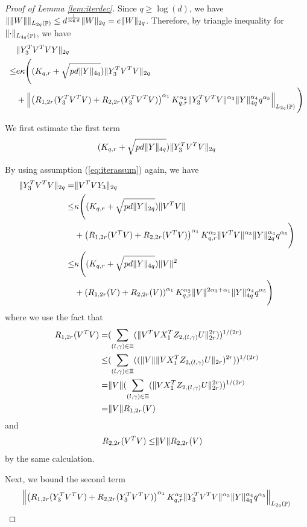 \documentclass[10pt,a4paper]{amsart}
\DeclareMathOperator{\Pb}{\mathbb{P}}
\DeclarePairedDelimiter{\norm}{\lVert}{\rVert}
\newcommand{\norml}[1]{\left\lVert#1\right\rVert}
\begin{document}
\begin{proof}[Proof of Lemma \ref{lem:iterdec}]
Since $q \ge \log(d)$, we have $\norm{\norm{W}}_{L_{2q}(\Pb)}  \le d^{\frac{1}{\log d}} \norm{W}_{2q}= e \norm{W}_{2q}$. Therefore, by triangle inequality for $\norm{\cdot}_{L_{4q}(\Pb)}$, we have
    \begin{align*}
    &\norm{Y_3^TV^TVY}_{2q} \\\le& e\kappa \Bigg((K_{q,r}+\sqrt{pd\norm{Y}_{4q}})\norm{Y_3^TV^TV}_{2q} \\&+ \norml{\left(R_{1,2r}(Y_3^TV^TV)+R_{2,2r}(Y_3^TV^TV)\right)^{\alpha_1}K_{q,r}^{\alpha_2}\norm{Y_3^TV^TV}^{\alpha_3} \norm{Y}_{4q} ^{\alpha_4}q^{\alpha_5}}_{L_{2q}(\Pb)}\Bigg)
\end{align*}


We first estimate the first term
\begin{align*}
    (K_{q,r}+\sqrt{pd\norm{Y}_{4q}})\norm{Y_3^TV^TV}_{2q}
\end{align*}

By using assumption (\ref{eq:iterassum}) again, we have
\begin{align*}
    \norm{Y_3^TV^TV}_{2q}=&\norm{V^TVY_3}_{2q} \\\le& \kappa \Bigg((K_{q,r}+\sqrt{pd\norm{Y}_{2q}})\norm{V^TV} \\&+ \left(R_{1,2r}(V^TV)+R_{2,2r}(V^TV)\right)^{\alpha_1}K_{q,r}^{\alpha_2}\norm{V^TV}^{\alpha_3} \norm{Y}_{2q}^{\alpha_4}q^{\alpha_5}\Bigg)
    \\\le& \kappa \Bigg((K_{q,r}+\sqrt{pd\norm{Y}_{4q}})\norm{V}^2 \\&+ \left(R_{1,2r}(V)+R_{2,2r}(V)\right)^{\alpha_1}K_{q,r}^{\alpha_2}\norm{V}^{2\alpha_3+\alpha_1} \norm{Y}_{4q}^{\alpha_4}q^{\alpha_5}\Bigg)
\end{align*}
where we use the fact that
\begin{align*}
    R_{1,2r}(V^TV)=&(\sum\limits_{(l,\gamma) \in \Xi}(\norm{V^TVX_1^TZ_{2,(l,\gamma)}U}_{2r}^{2r}))^{1/(2r)}
    \\ \le &(\sum\limits_{(l,\gamma) \in \Xi}((\norm{V}\norm{VX_1^TZ_{2,(l,\gamma)}U}_{2r})^{2r}))^{1/(2r)}
    \\ = &\norm{V}(\sum\limits_{(l,\gamma) \in \Xi}(\norm{VX_1^TZ_{2,(l,\gamma)}U}_{2r}^{2r}))^{1/(2r)}
    \\=& \norm{V}R_{1,2r}(V)
\end{align*}
and
\begin{align*}
    R_{2,2r}(V^TV) \le & \norm{V}R_{2,2r}(V)
\end{align*}
by the same calculation.

Next, we bound the second term
\begin{align*}
    \norml{\left(R_{1,2r}(Y_3^TV^TV)+R_{2,2r}(Y_3^TV^TV)\right)^{\alpha_1}K_{q,r}^{\alpha_2}\norm{Y_3^TV^TV}^{\alpha_3} \norm{Y}_{4q} ^{\alpha_4}q^{\alpha_5}}_{L_{2q}(\Pb)}
\end{align*}


\end{proof}
\end{document}
